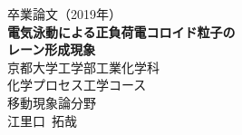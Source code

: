 \begin{titlepage}
\begin{center}
\vspace*{50truept}
{\huge 卒業論文（2019年）}\\
\vspace*{100truept}
{\huge \textbf{電気泳動による正負荷電コロイド粒子の\\レーン形成現象}}\\
\vspace{120truept}
{\LARGE 京都大学工学部工業化学科}\\ 
{\LARGE 化学プロセス工学コース}\\ 
{\LARGE 移動現象論分野}\\ 
\vspace{50truept}
{\LARGE 江里口\ 拓哉}\\
\vspace{50truept}
\end{center}
\end{titlepage}
